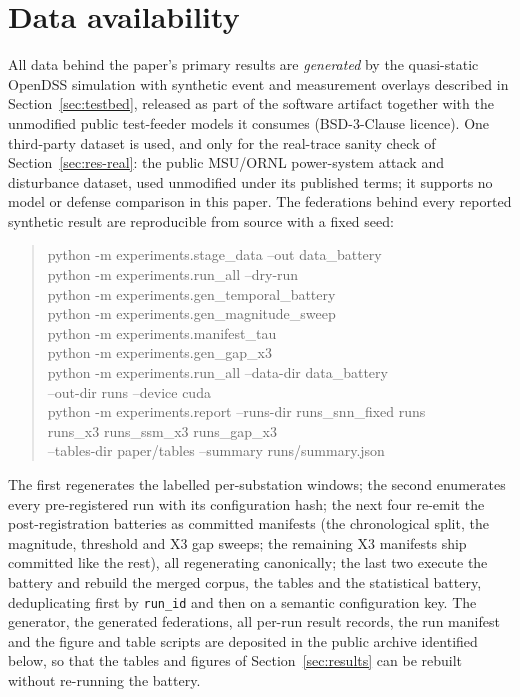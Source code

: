 \section*{Data availability}

All data behind the paper's primary results are \emph{generated} by the
quasi-static OpenDSS simulation with synthetic event and measurement
overlays described in Section~\ref{sec:testbed}, released as part of the
software artifact together with the unmodified public test-feeder models
it consumes \cite{kersting2001} (BSD-3-Clause licence). One third-party
dataset is used, and only for the real-trace sanity check of
Section~\ref{sec:res-real}: the public MSU/ORNL power-system attack and
disturbance dataset, used unmodified under its published terms; it
supports no model or defense comparison in this paper. The federations
behind every reported synthetic result are reproducible from source with
a fixed seed:

\begin{quote}\scriptsize\ttfamily\raggedright
python -m experiments.stage\_data --out data\_battery\\
python -m experiments.run\_all --dry-run\\
python -m experiments.gen\_temporal\_battery\\
python -m experiments.gen\_magnitude\_sweep\\
python -m experiments.manifest\_tau\\
python -m experiments.gen\_gap\_x3\\
python -m experiments.run\_all --data-dir data\_battery\\
\mbox{}\quad --out-dir runs --device cuda\\
python -m experiments.report --runs-dir runs\_snn\_fixed runs\\
\mbox{}\quad runs\_x3 runs\_ssm\_x3 runs\_gap\_x3\\
\mbox{}\quad --tables-dir paper/tables --summary runs/summary.json
\end{quote}

The first regenerates the labelled per-substation windows; the second
enumerates every pre-registered run with its configuration hash; the next
four re-emit the post-registration batteries as committed manifests (the
chronological split, the magnitude, threshold and X3 gap sweeps; the
remaining X3 manifests ship committed like the rest), all regenerating
canonically; the last two execute the battery and rebuild the merged
corpus, the tables and the statistical battery, deduplicating first by
\texttt{run\_id} and then on a semantic configuration key. The generator,
the generated federations, all per-run result records, the run manifest
and the figure and table scripts are deposited in the public archive
identified below, so that the tables and figures of
Section~\ref{sec:results} can be rebuilt without re-running the battery.


